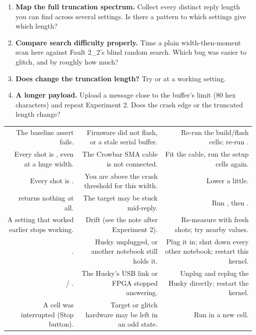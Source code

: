 \documentclass[11pt,letterpaper]{article}
\begin{document}

\begin{enumerate}[label=\arabic*.,leftmargin=1.8em,itemsep=2pt,topsep=2pt,parsep=0pt,start=1]
\item \textbf{Map the full truncation spectrum.} Collect every distinct reply length you can find across several settings. Is there a pattern to which settings give which length?
\item \textbf{Compare search difficulty properly.} Time a plain width-then-moment scan here against Fault 2\_2's blind random search. Which bug was easier to glitch, and by roughly how much?
\item \textbf{Does  change the truncation length?} Try  or  at a working setting.
\item \textbf{A longer payload.} Upload a message close to the buffer's limit (80 hex characters) and repeat Experiment 2. Does the crash edge or the truncated length change?
\end{enumerate}


{\small{}
\begin{longtable}{|R{0.2899}|R{0.3043}|R{0.4058}|}
\hline
{} &  &  \\ \hline
\endhead
The baseline assert fails. & Firmware did not flash, or a stale serial buffer. & Re-run the build/flash cells; re-run . \\ \hline
Every shot is , even at a huge width. & The Crowbar SMA cable is not connected. & Fit the cable, run the setup cells again. \\ \hline
Every shot is . & You are above the crash threshold for this width. & Lower  a little. \\ \hline
{} returns nothing at all. & The target may be stuck mid-reply. & Run , then . \\ \hline
A setting that worked earlier stops working. & Drift (see the note after Experiment 2). & Re-measure with fresh shots; try nearby  values. \\ \hline
{}. & Husky unplugged, or another notebook still holds it. & Plug it in; shut down every other notebook; restart this kernel. \\ \hline
{} / . & The Husky's USB link or FPGA stopped answering. & Unplug and replug the Husky directly; restart the kernel. \\ \hline
A cell was interrupted (Stop button). & Target or glitch hardware may be left in an odd state. & Run  in a new cell. \\ \hline
\end{longtable}}
\end{document}
